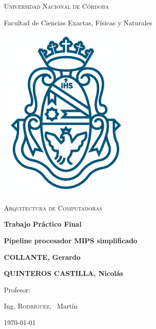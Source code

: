 \documentclass[a4paper]{article}
\begin{document}
\renewcommand\tablename{Tabla}
\renewcommand\figurename{Imagen}
\begin{titlepage}
	
	{\scshape\LARGE Universidad Nacional de Córdoba \par}
	{\Large Facultad de Ciencias Exactas, Físicas y Naturales \par}
	\vspace{0.5cm}
	\centering
	\includegraphics[width=0.5\textwidth]{unc.png}
	\par\vspace{0.5cm}
	\vspace{0.5cm}
	{\scshape\Large Arquitectura de Computadoras\par}
	\vspace{1.5cm}
	{\large\bfseries Trabajo Práctico Final \par}
	\vspace{0.2cm}
	{\normalsize \bfseries Pipeline procesador MIPS simplificado \par}
	\vspace{1.5cm}
	{\Large\bfseries COLLANTE, Gerardo\par}
	{\Large\bfseries QUINTEROS CASTILLA, Nicolás\par}
	\vfill
	Profesor:\par
	Ing. \textsc{Rodríguez}, ~Martín
	

	\vfill

	{\large \today\par}
\end{titlepage}

\end{document}
